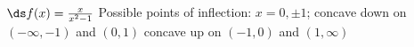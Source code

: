 {$\ds f(x) = \frac{x}{x^2-1}$
}
{Possible points of inflection: $x=0,\pm 1$;
concave down on $(-\infty,-1)$ and $(0,1)$
concave up on $(-1,0)$ and $(1,\infty)$
}
